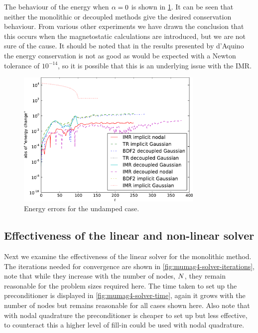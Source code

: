The behaviour of the energy when $\alpha = 0$ is shown in \cref{fig:energy-conservation}.
It can be seen that neither the monolithic or decoupled methods give the desired conservation behaviour.
From various other experiments we have drawn the conclusion that this occurs when the magnetostatic calculations are introduced, but we are not sure of the cause.
It should be noted that in the results presented by d'Aquino \cite{DAquino2005} the energy conservation is not as good as would be expected with a Newton tolerance of $10^{-14}$, so it is possible that this is an underlying issue with the IMR.

\begin{figure}
  \centering
  \includegraphics[width=0.8\textwidth]
  {plots/sq_mumag4_energy_conservation/absofenergychangevstimes.pdf}
  \caption{Energy errors for the undamped case.}
  \label{fig:energy-conservation}
\end{figure}


\subsection{Effectiveness of the linear and non-linear solver}

Next we examine the effectiveness of the linear solver for the monolithic method.
The iterations needed for convergence are shown in \cref{fig:mumag4-solver-iterations}, note that while they increase with the number of nodes, $N$, they remain reasonable for the problem sizes required here.
The time taken to set up the preconditioner is displayed in \cref{fig:mumag4-solver-time}, again it grows with the number of nodes but remains reasonable for all cases shown here.
Also note that with nodal quadrature the preconditioner is cheaper to set up but less effective, to counteract this a higher level of fill-in could be used with nodal quadrature.

